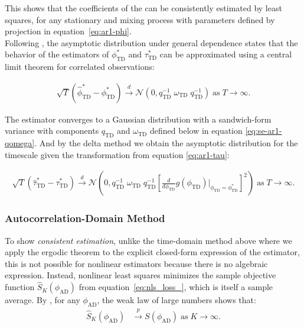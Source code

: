 \documentclass[9pt]{article}
\newcommand{\phitd}{\phi_{\scriptscriptstyle\text{TD}}}
\newcommand{\hatphitd}{\hat{\phi}^*_{\scriptscriptstyle\text{TD}}}
\newcommand{\tautd}{\tau_{\scriptscriptstyle\text{TD}}}
\newcommand{\hattautd}{\hat{\tau}^*_{\scriptscriptstyle\text{TD}}}
\newcommand{\qtd}{q_{\scriptscriptstyle\text{TD}}}
\newcommand{\omegatd}{\omega_{\scriptscriptstyle\text{TD}}}
\newcommand{\phiad}{\phi_{\scriptscriptstyle\text{AD}}}
\begin{document}
\noindent This shows that the coefficients of the  can be consistently estimated by least squares, for any stationary and mixing process with parameters defined by projection in equation~\eqref{eq:ar1-phi}.\\

Following \citet[Theorem~14.33]{hansen_econometrics_2022}, the asymptotic distribution under general dependence states that the behavior of the estimators of $\phitd^*$ and $\tautd^*$ can be approximated using a central limit theorem for correlated observations:

\begin{align}\label{eq:ar1-phi-clt}
    \sqrt{T}(\hatphitd - \phitd^*) \overset{d}{\to} \mathcal{N}(0, \qtd^{-1}\; \omegatd \; \qtd^{-1})\;\text{as}\;T\to\infty.
\end{align}

\noindent The estimator converges to a Gaussian distribution with a sandwich-form variance with components $\qtd$ and $\omegatd$ defined below in equation \eqref{eq:se-ar1-qomega}. And by the delta method we obtain the asymptotic distribution for the timescale given the transformation from equation \eqref{eq:ar1-tau}:

\begin{align}
    \sqrt{T}(\hattautd - \tautd^*) \overset{d}{\to} \mathcal{N}(0, \qtd^{-1}\; \omegatd \; \qtd^{-1} \left[\frac{d}{d\phitd} g(\phitd)\big|_{\phitd=\phitd^*}\right]^2)\;\text{as}\;T\to\infty.
\end{align}

\subsubsection{Autocorrelation-Domain Method}

To show \textit{consistent estimation}, unlike the time-domain method above where we apply the ergodic theorem to the explicit closed-form expression of the estimator, this is not possible for nonlinear estimators because there is no algebraic expression. Instead, nonlinear least squares minimizes the sample objective function $\widehat{S}_{K}(\phiad)$ from equation~\eqref{eq:nls_loss_}, which is itself a sample average. By \citet[Theorem~22.1]{hansen_econometrics_2022}, for any $\phiad$, the weak law of large numbers shows that:
\begin{align}
\widehat{S}_K(\phiad) &\overset{p}{\to} S(\phiad) \;\text{as}\;K\to\infty.
\end{align}
\end{document}

